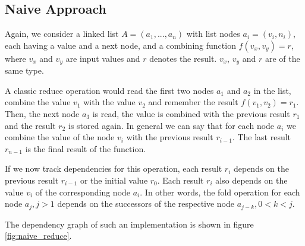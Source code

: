 \subsection{Naive Approach}

Again, we consider a linked list $A = (a_1, ..., a_n)$ with list nodes $a_i = (v_i, n_i)$, each having a value and a next node, and a combining function $f(v_x, v_y) = r$, where $v_x$ and $v_y$ are input values and $r$ denotes the result. $v_x$, $v_y$ and $r$ are of the same type. 

A classic reduce operation would read the first two nodes $a_1$ and $a_2$ in the list, combine the value $v_1$ with the value $v_2$ and remember the result $f(v_1, v_2) = r_1$. Then, the next node $a_3$ is read, the value is combined with the previous result $r_1$ and the result $r_2$ is stored again. In general we can say that for each node $a_i$ we combine the value of the node $v_i$ with the previous result $r_{i-1}$. The last result $r_{n-1}$ is the final result of the function. 

If we now track dependencies for this operation, each result $r_i$ depends on the previous result $r_{i - 1}$ or the initial value $r_0$. Each result $r_i$ also depends on the value $v_i$ of the corresponding node $a_i$. In other words, the fold operation for each node $a_j, j > 1$ depends on the successors of the respective node $a_{j - k}, 0 < k < j$.

The dependency graph of such an implementation is shown in figure \ref{fig:naive_reduce}. 

